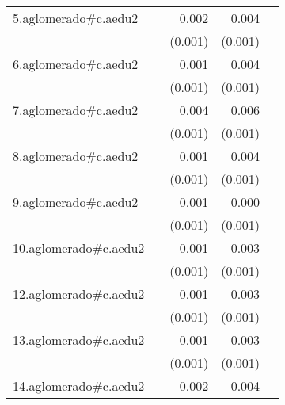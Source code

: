 {\begin{longtable}{l*{4}{D{.}{.}{-1}}}
\addlinespace
5.aglomerado#c.aedu2&                     &       0.002         &       0.004\sym{***}&                     \\
            &                     &     (0.001)         &     (0.001)         &                     \\
\addlinespace
6.aglomerado#c.aedu2&                     &       0.001         &       0.004\sym{***}&                     \\
            &                     &     (0.001)         &     (0.001)         &                     \\
\addlinespace
7.aglomerado#c.aedu2&                     &       0.004\sym{**} &       0.006\sym{***}&                     \\
            &                     &     (0.001)         &     (0.001)         &                     \\
\addlinespace
8.aglomerado#c.aedu2&                     &       0.001         &       0.004\sym{***}&                     \\
            &                     &     (0.001)         &     (0.001)         &                     \\
\addlinespace
9.aglomerado#c.aedu2&                     &      -0.001         &       0.000         &                     \\
            &                     &     (0.001)         &     (0.001)         &                     \\
\addlinespace
10.aglomerado#c.aedu2&                     &       0.001         &       0.003\sym{**} &                     \\
            &                     &     (0.001)         &     (0.001)         &                     \\
\addlinespace
12.aglomerado#c.aedu2&                     &       0.001         &       0.003\sym{***}&                     \\
            &                     &     (0.001)         &     (0.001)         &                     \\
\addlinespace
13.aglomerado#c.aedu2&                     &       0.001         &       0.003\sym{***}&                     \\
            &                     &     (0.001)         &     (0.001)         &                     \\
\addlinespace
14.aglomerado#c.aedu2&                     &       0.002         &       0.004\sym{***}&                     \\

\end{longtable}}
